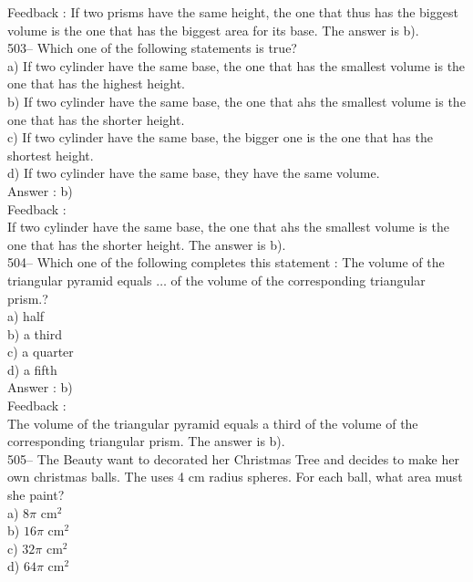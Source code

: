 ﻿\documentclass[letterpaper, 12pt]{article}
\begin{document}
Feedback :
If two prisms have the same height, the one that thus has the biggest volume is the one that has the biggest area for its base. The answer is
b).\\

503-- Which one of the following statements is true? \\
a) If two cylinder have the same base, the one that has the smallest volume is the one that has the highest height.\\
b) If two cylinder have the same base, the one that ahs the smallest volume is the one that has the shorter height.\\
c) If two cylinder have the same base, the bigger one is the one that has the shortest height.\\
d) If two cylinder have the same base, they have the same volume.\\

Answer : b)\\

Feedback :  \\
If two cylinder have the same base, the one that ahs the smallest volume is the one that has the shorter height.  The answer is b).\\

504-- Which one of the following completes this statement : \og The volume of the triangular pyramid equals $\ldots$ of the volume of the corresponding triangular prism.\fg?\\
a) half\\
b) a third\\
c) a quarter\\
d) a fifth\\

Answer : b)\\

Feedback :  \\
The volume of the triangular pyramid equals a third of the volume of the corresponding triangular prism.  The answer is b).\\

505-- The Beauty want to decorated her Christmas Tree and decides to make her own christmas balls. The uses 4 cm radius spheres. For each ball, what area must she paint?\\
a) $8\pi$ cm$^{2}$\\
b) $16\pi$ cm$^{2}$\\
c) $32\pi$ cm$^{2}$\\
d) $64\pi$ cm$^{2}$\\
\end{document}
